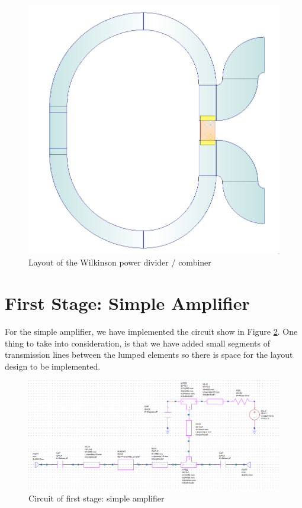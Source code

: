 \documentclass[12pt]{report} %
\let\oldsection\section
\renewcommand\section{\clearpage\oldsection}
\begin{document}
\begin{figure}[htbp]
    \centering
    \includegraphics[width=1\linewidth]{images//microstrip_elements/wilkinson_microstrip_tune_layout.png}
    \caption{Layout of the Wilkinson power divider / combiner}
    \label{fig:microstrip_elements:wilkinson_microstrip_tune_layout}
\end{figure}

\section{First Stage: Simple Amplifier}

For the simple amplifier, we have implemented the circuit show in Figure \ref{fig:microstrip_elements:simple_amplifier_microstrip_circuit}. One thing to take into consideration, is that we have added small segments of transmission lines between the lumped elements so there is space for the layout design to be implemented.

\begin{figure}[htbp]
    \centering
    \includegraphics[width=1\linewidth]{images//microstrip_elements/simple_amplifier_microstrip_circuit.png}
    \caption{Circuit of first stage: simple amplifier}
    \label{fig:microstrip_elements:simple_amplifier_microstrip_circuit}
\end{figure}
\end{document}

